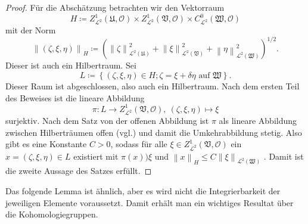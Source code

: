 \documentclass[11pt,a4paper,toc=bibliography]{scrartcl}
\theoremstyle{def}
\theoremstyle{thm}
\theoremstyle{remark}
\newcommand*{\norm}[1]{\left\lVert#1\right\rVert} %
\begin{document}
\begin{proof}
Für die Abschätzung betrachten wir den Vektorraum 
\[
H\coloneqq Z^1_{\mathcal{L}^2}(\mathfrak{U},\mathcal{O})\times Z^1_{\mathcal{L}^2}(\mathfrak{V},\mathcal{O})\times C^0_{\mathcal{L}^2}(\mathfrak{W},\mathcal{O})
\]
mit der Norm
\[
\norm{(\zeta,\xi,\eta)}_{H}\coloneqq \left( \norm{\zeta}_{\mathcal{L}^2(\mathfrak{U})}^2+\norm{\xi}_{\mathcal{L}^2(\mathfrak{V})}^2+\norm{\eta}_{\mathcal{L}^2(\mathfrak{W})}^2\right)^{1/2}.
\]
Dieser ist auch ein Hilbertraum. Sei 
\[
L\coloneqq\left\{ (\zeta,\xi,\eta)\in H; \zeta=\xi+\delta\eta\text{ auf } \mathfrak{W}\right\}.
\]
Dieser Raum ist abgeschlossen, also auch ein Hilbertraum. Nach dem ersten Teil des Beweises ist die lineare Abbildung
\[
\pi:L\rightarrow Z^1_{\mathcal{L}^2}(\mathfrak{V},\mathcal{O}),~(\zeta,\xi,\eta)\mapsto \xi
\]
surjektiv. 
Nach dem Satz von der offenen Abbildung ist $\pi$ als lineare Abbildung zwischen Hilberträumen offen (vgl.\cite[~S.168]{funkana}) und damit die Umkehrabbildung stetig. Also gibt es eine Konstante $C>0$, sodass für alle $\xi\in Z^1_{\mathcal{L}^2}(\mathfrak{V},\mathcal{O})$ ein $x=(\zeta,\xi,\eta)\in L$ existiert mit $\pi(x))\xi$ und $\norm{x}_H\leq C\norm{\xi}_{\mathcal{L}^2(\mathfrak{W})}$ .
Damit ist die zweite Aussage des Satzes erfüllt.
\end{proof}
Das folgende Lemma ist ähnlich, aber es wird nicht die Integrierbarkeit der jeweiligen Elemente voraussetzt. Damit erhält man ein wichtiges Resultat über die Kohomologiegruppen.
\end{document}
